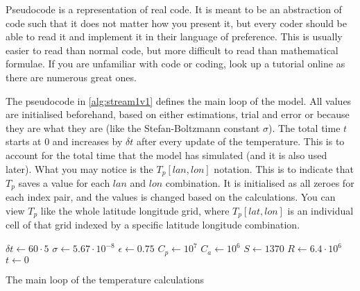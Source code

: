 Pseudocode is a representation of real code. It is meant to be an abstraction of code such that it does not matter how you present it, but every coder should be able to read it and implement 
it in their language of preference. This is usually easier to read than normal code, but more difficult to read than mathematical formulae. If you are unfamiliar with code or coding, look up 
a tutorial online as there are numerous great ones.

The pseudocode in \autoref{alg:stream1v1} defines the main loop of the model. All values are initialised beforehand, based on either estimations, trial and error or because they are what they 
are (like the Stefan-Boltzmann constant $\sigma$). The total time $t$ starts at 0 and increases by $\delta t$ after every update of the temperature. This is to account for the total time that 
the model has simulated (and it is also used later). What you may notice is the $T_p[lan, lon]$ notation. This is to indicate that $T_p$ saves a value for each $lan$ and $lon$ combination.
It is initialised as all zeroes for each index pair, and the values is changed based on the calculations. You can view $T_p$ like the whole latitude longitude grid, where $T_p[lat, lon]$ is an 
individual cell of that grid indexed by a specific latitude longitude combination.

\begin{algorithm}[hbt]
    \SetAlgoLined
    $\delta t \leftarrow 60 \cdot 5$ \;
    $\sigma \leftarrow 5.67 \cdot 10^{-8}$ \;
    $\epsilon \leftarrow 0.75$ \;
    $C_p \leftarrow 10^7$ \;
    $C_a \leftarrow 10^6$ \;
    $S \leftarrow 1370$ \;
    $R \leftarrow 6.4 \cdot 10^6$ \;
    $t \leftarrow 0$ \;

    \caption{The main loop of the temperature calculations}
    \label{alg:stream1v1}
\end{algorithm}


